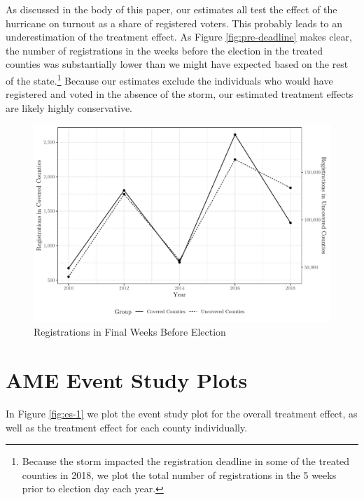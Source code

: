 \documentclass[
  12pt,
]{article}
\begin{document}
As discussed in the body of this paper, our estimates all test the effect of the hurricane on turnout as a share of registered voters. This probably leads to an underestimation of the treatment effect. As Figure \ref{fig:pre-deadline} makes clear, the number of registrations in the weeks before the election in the treated counties was substantially lower than we might have expected based on the rest of the state.\footnote{Because the storm impacted the registration deadline in some of the treated counties in 2018, we plot the total number of registrations in the 5 weeks prior to election day each year.} Because our estimates exclude the individuals who would have registered and voted in the absence of the storm, our estimated treatment effects are likely highly conservative.

\begin{figure}[H]

{\centering \includegraphics{si_files/figure-latex/regs-chunk-1} 

}

\caption{\label{fig:pre-deadline}Registrations in Final Weeks Before Election}\label{fig:regs-chunk}
\end{figure}

\hypertarget{ame-event-study-plots}{%
\section*{AME Event Study Plots}\label{ame-event-study-plots}}

In Figure \ref{fig:es-1} we plot the event study plot for the overall treatment effect, as well as the treatment effect for each county individually.
\end{document}
